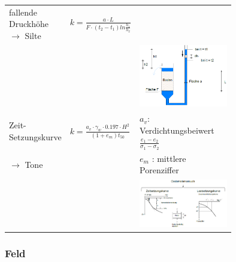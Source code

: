 \begin{landscape}
\begin{minipage}{0.5\linewidth}
\begin{tabular}{p{0.25\linewidth}|l|p{0.5\linewidth}}
		fallende Druckhöhe $ \rightarrow $ Silte	& $ k = \frac{a \cdot L}{F \cdot (t_2 - t_1) ln \frac{h_1}{h_2}} $	& \\
					&		& \vspace*{-1.25cm} \includegraphics[width=0.8\linewidth]{images/GW5kfall.PNG} \\ \hline
		
		Zeit-Setzungskurve	& $ k = \frac{a_v \cdot \gamma_w \cdot 0.197 \cdot H^2}{(1 + e_m) t_{50}} $ & $a_v$: Verdichtungsbeiwert $ \frac{e_1 - e_2}{\sigma_1 - \sigma_2}$ \\
		$ \rightarrow $ Tone &			& $e_m$ : mittlere Porenziffer \\
					&					& \includegraphics[width=\linewidth]{images/GW6Oedometer.PNG} \\
		
	\end{tabular}
\end{minipage}
\begin{minipage}{\linewidth}
	
	\subsubsection{Feld}
	

\end{minipage}
\end{landscape}

